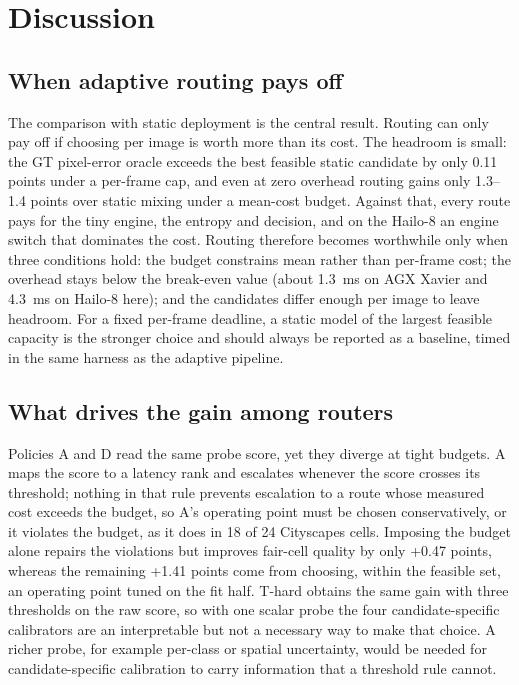 \documentclass[a4paper,5p]{elsarticle}
\begin{document}
\section{Discussion}
\label{sec:discussion}

\subsection{When adaptive routing pays off}

The comparison with static deployment is the central result. Routing can only pay off if choosing per image is worth more than its cost. The headroom is small: the GT pixel-error oracle exceeds the best feasible static candidate by only 0.11 points under a per-frame cap, and even at zero overhead routing gains only 1.3--1.4 points over static mixing under a mean-cost budget. Against that, every route pays for the tiny engine, the entropy and decision, and on the Hailo-8 an engine switch that dominates the cost. Routing therefore becomes worthwhile only when three conditions hold: the budget constrains mean rather than per-frame cost; the overhead stays below the break-even value (about 1.3~ms on AGX Xavier and 4.3~ms on Hailo-8 here); and the candidates differ enough per image to leave headroom. For a fixed per-frame deadline, a static model of the largest feasible capacity is the stronger choice and should always be reported as a baseline, timed in the same harness as the adaptive pipeline.

\subsection{What drives the gain among routers}

Policies A and D read the same probe score, yet they diverge at tight budgets. A maps the score to a latency rank and escalates whenever the score crosses its threshold; nothing in that rule prevents escalation to a route whose measured cost exceeds the budget, so A's operating point must be chosen conservatively, or it violates the budget, as it does in 18 of 24 Cityscapes cells. Imposing the budget alone repairs the violations but improves fair-cell quality by only +0.47 points, whereas the remaining +1.41 points come from choosing, within the feasible set, an operating point tuned on the fit half. T-hard obtains the same gain with three thresholds on the raw score, so with one scalar probe the four candidate-specific calibrators are an interpretable but not a necessary way to make that choice. A richer probe, for example per-class or spatial uncertainty, would be needed for candidate-specific calibration to carry information that a threshold rule cannot.
\end{document}
